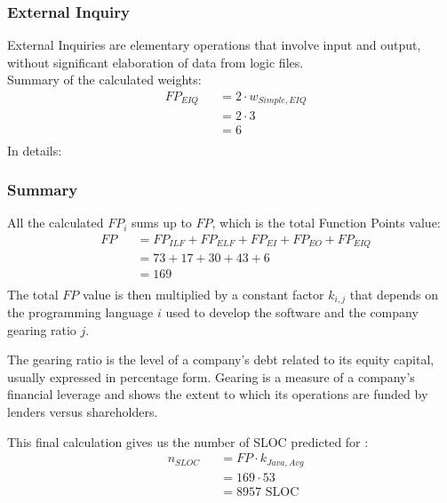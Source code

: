 \subsubsection{External Inquiry}
External Inquiries are elementary operations that involve input and output, without significant elaboration of data from logic files.\\
Summary of the calculated weights:
\begin{equation*}
	\begin{aligned}
		&	FP_{EIQ}
		& & = 2 \cdot w_{Simple,EIQ}\\
		&&& = 2 \cdot 3\\
		&&& = 6\\
	\end{aligned}
\end{equation*}
In details:
\begin{itemize}
\end{itemize}
%
\subsubsection{Summary}
All the calculated $FP_{i}$ sums up to $FP$, which is the total Function Points value:
\begin{equation*}
	\begin{aligned}
		&	FP
		& & = FP_{ILF} + FP_{ELF} + FP_{EI} + FP_{EO} + FP_{EIQ}\\
		&&& = 73 + 17 + 30 + 43 + 6\\
		&&& = 169\\	
	\end{aligned}
\end{equation*}
The total $FP$ value is then multiplied by a constant factor $k_{i,j}$ that depends on the programming language $i$ used to develop the software and the company gearing ratio $j$.\par
The gearing ratio is the level of a company's debt related to its equity capital, usually expressed in percentage form.
Gearing is a measure of a company's financial leverage and shows the extent to which its operations are funded by lenders versus shareholders.\par
This final calculation gives us the number of SLOC predicted for \myTaxiService{}:
\begin{equation*}
	\begin{aligned}
		&   n_{SLOC}
		& & = FP \cdot k_{Java, Avg}\\
		&&& = 169 \cdot 53\\
		&&& = 8957 \text{ SLOC}
	\end{aligned}
\end{equation*}
%
